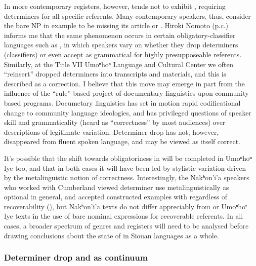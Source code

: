 \documentclass[output=paper]{LSP/langsci}
\begin{document}
In more contemporary registers, however,  tends not to exhibit , requiring determiners for all specific referents. Many contemporary speakers, thus, consider the bare NP  in example  to be missing its article  or . Hiroki Nomoto (p.c.) informs me that the same phenomenon occurs in certain obligatory-classifier languages such as , in which speakers vary on whether they drop determiners (classifiers) or even accept  as grammatical for highly presupposeable referents. Similarly, at the Title VII Umoⁿhoⁿ Language and Cultural Center we often “reinsert” dropped determiners into transcripts and materials, and this is described as a correction. I believe that this move may emerge in part from the influence of the “rule”-based project of documentary linguistics upon community-based programs. Documetary linguistics has set in motion rapid codificational change to community language ideologies, and has privileged questions of speaker skill and grammaticality (heard as “correctness” by most audiences) over descriptions of legitimate variation. Determiner drop has not, however, disappeared from fluent spoken language, and may be viewed as itself correct.

	It’s possible that the shift towards obligatoriness in  will be completed in Umoⁿhoⁿ Iye too, and that in both cases it will have been led by stylistic variation driven by the metalinguistic notion of correctness. Interestingly, the Nakʰon’i’a speakers who worked with Cumberland viewed determiner use metalinguistically as optional in general, and accepted constructed examples with  regardless of recoverability (\citealt[345]{Cumberland2005}), but Nakʰon’i’a texts do not differ appreciably from  or Umoⁿhoⁿ Iye texts in the use of bare nominal expressions for recoverable referents. In all cases, a broader spectrum of genres and registers will need to be analysed before drawing conclusions about the state of  in Siouan languages as a whole.

\subsubsection{Determiner drop and  as continuum}\label{dropincorp}
\end{document}
